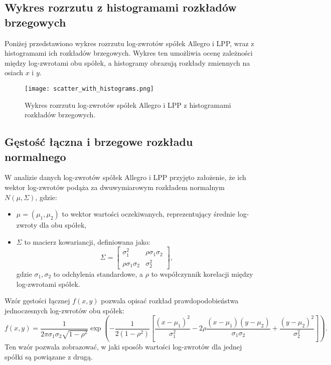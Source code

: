 \documentclass[12pt]{article}
\begin{document}
\subsection{Wykres rozrzutu z histogramami rozkładów brzegowych}

Poniżej przedstawiono wykres rozrzutu log-zwrotów spółek Allegro i LPP, wraz z histogramami ich rozkładów brzegowych. Wykres ten umożliwia ocenę zależności między log-zwrotami obu spółek, a histogramy obrazują rozkłady zmiennych na osiach \( x \) i \( y \).

\begin{figure}[H]
    \centering
    \texttt{[image: scatter\_with\_histograms.png]}
    \caption{Wykres rozrzutu log-zwrotów spółek Allegro i LPP z histogramami rozkładów brzegowych.}
    \label{fig:scatter_histograms}
\end{figure}


\subsection{Gęstość łączna i brzegowe rozkładu normalnego}

W analizie danych log-zwrotów spółek Allegro i LPP przyjęto założenie, że ich wektor log-zwrotów podąża za dwuwymiarowym rozkładem normalnym \( N(\mu, \Sigma) \), gdzie:
\begin{itemize}
    \item \( \mu = (\mu_1, \mu_2) \) to wektor wartości oczekiwanych, reprezentujący średnie log-zwroty dla obu spółek,
    \item \( \Sigma \) to macierz kowariancji, definiowana jako:
    \[
    \Sigma =
    \begin{bmatrix}
    \sigma_1^2 & \rho \sigma_1 \sigma_2 \\
    \rho \sigma_1 \sigma_2 & \sigma_2^2
    \end{bmatrix},
    \]
    gdzie \( \sigma_1, \sigma_2 \) to odchylenia standardowe, a \( \rho \) to współczynnik korelacji między log-zwrotami spółek.
\end{itemize}

\noindent Wzór gęstości łącznej \( f(x, y) \) pozwala opisać rozkład prawdopodobieństwa jednoczesnych log-zwrotów obu spółek:
\[
f(x, y) = \frac{1}{2 \pi \sigma_1 \sigma_2 \sqrt{1-\rho^2}}
\exp\left(-\frac{1}{2(1-\rho^2)} \left[
\frac{(x-\mu_1)^2}{\sigma_1^2} - 2\rho \frac{(x-\mu_1)(y-\mu_2)}{\sigma_1\sigma_2} + \frac{(y-\mu_2)^2}{\sigma_2^2}
\right]\right).
\]
Ten wzór pozwala zobrazować, w jaki sposób wartości log-zwrotów dla jednej spółki są powiązane z drugą.
\end{document}
